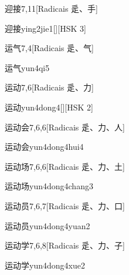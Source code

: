 \begin{entry}{迎接}{7,11}[Radicais ⾡、⼿]
  \begin{phonetics}{迎接}{ying2jie1}[][HSK 3]
  \end{phonetics}
\end{entry}

\begin{entry}{运气}{7,4}[Radicais ⾡、⽓]
  \begin{phonetics}{运气}{yun4qi5}
  \end{phonetics}
\end{entry}

\begin{entry}{运动}{7,6}[Radicais ⾡、⼒]
  \begin{phonetics}{运动}{yun4dong4}[][HSK 2]
  \end{phonetics}
\end{entry}

\begin{entry}{运动会}{7,6,6}[Radicais ⾡、⼒、⼈]
  \begin{phonetics}{运动会}{yun4dong4hui4}
  \end{phonetics}
\end{entry}

\begin{entry}{运动场}{7,6,6}[Radicais ⾡、⼒、⼟]
  \begin{phonetics}{运动场}{yun4dong4chang3}
  \end{phonetics}
\end{entry}

\begin{entry}{运动员}{7,6,7}[Radicais ⾡、⼒、⼝]
  \begin{phonetics}{运动员}{yun4dong4yuan2}
  \end{phonetics}
\end{entry}

\begin{entry}{运动学}{7,6,8}[Radicais ⾡、⼒、⼦]
  \begin{phonetics}{运动学}{yun4dong4xue2}
  \end{phonetics}
\end{entry}


